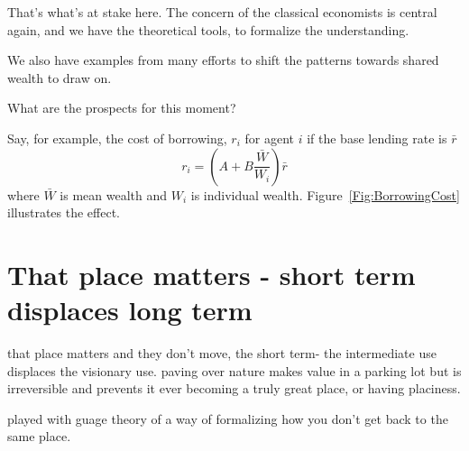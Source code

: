 
That's what's at stake here.
The concern of the classical economists is central again, and we have the theoretical tools, to formalize the understanding.

We also have examples from many efforts to shift the patterns towards shared wealth to draw on. 

What are the prospects for this moment?

Say, for example, the cost of borrowing, $r_i$ for agent $i$ if the base lending rate is $\bar{r}$
\[ r_i = (A + B \frac{\bar{W}}{W_i})\bar r\]
where $\bar{W}$ is mean wealth and $W_i$ is individual wealth. Figure~\ref{Fig:BorrowingCost} illustrates the effect.


\section{That place matters - short term displaces long term}
that place matters and they don't move, the short term- the intermediate use displaces the visionary use. 
paving over nature makes value in a parking lot but is irreversible and prevents it ever becoming a truly great place, or having placiness.

played with guage theory of a way of formalizing how you don't get back to the same place. 